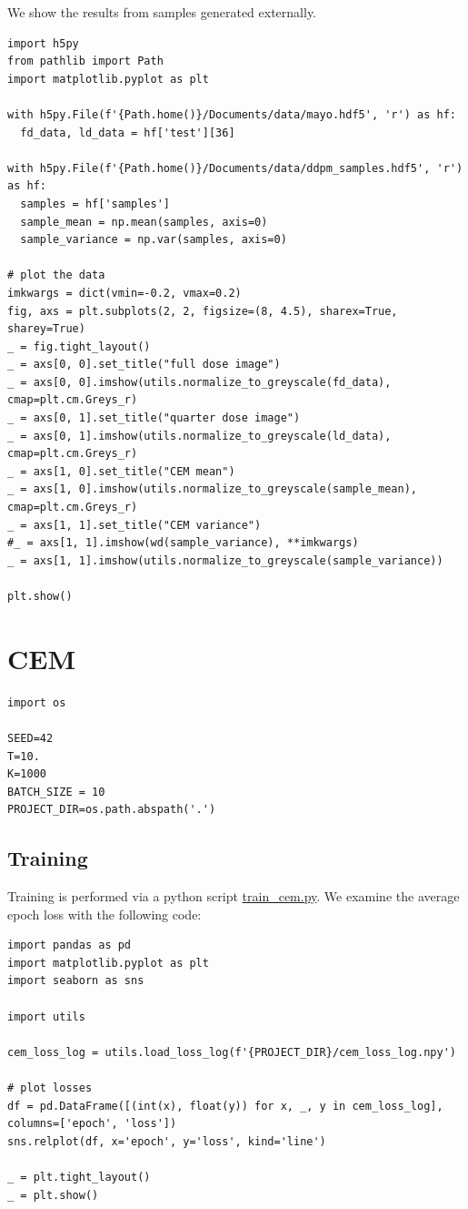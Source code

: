 \documentclass[a4paper, 11pt]{article}
\begin{document}
We show the results from samples generated externally.
\begin{verbatim}
import h5py
from pathlib import Path
import matplotlib.pyplot as plt

with h5py.File(f'{Path.home()}/Documents/data/mayo.hdf5', 'r') as hf:
  fd_data, ld_data = hf['test'][36]

with h5py.File(f'{Path.home()}/Documents/data/ddpm_samples.hdf5', 'r') as hf:
  samples = hf['samples']
  sample_mean = np.mean(samples, axis=0)
  sample_variance = np.var(samples, axis=0)

# plot the data
imkwargs = dict(vmin=-0.2, vmax=0.2)
fig, axs = plt.subplots(2, 2, figsize=(8, 4.5), sharex=True, sharey=True)
_ = fig.tight_layout()
_ = axs[0, 0].set_title("full dose image")
_ = axs[0, 0].imshow(utils.normalize_to_greyscale(fd_data), cmap=plt.cm.Greys_r)
_ = axs[0, 1].set_title("quarter dose image")
_ = axs[0, 1].imshow(utils.normalize_to_greyscale(ld_data), cmap=plt.cm.Greys_r)
_ = axs[1, 0].set_title("CEM mean")
_ = axs[1, 0].imshow(utils.normalize_to_greyscale(sample_mean), cmap=plt.cm.Greys_r)
_ = axs[1, 1].set_title("CEM variance")
#_ = axs[1, 1].imshow(wd(sample_variance), **imkwargs)
_ = axs[1, 1].imshow(utils.normalize_to_greyscale(sample_variance))

plt.show()
\end{verbatim}

\section{CEM}
\label{sec:orgedab874}
\begin{verbatim}
import os

SEED=42
T=10.
K=1000
BATCH_SIZE = 10
PROJECT_DIR=os.path.abspath('.')
\end{verbatim}
\subsection{Training}
\label{sec:org750e617}
Training is performed via a python script \url{train\_cem.py}. We examine the average epoch loss with the following code:
\begin{verbatim}
import pandas as pd
import matplotlib.pyplot as plt
import seaborn as sns

import utils

cem_loss_log = utils.load_loss_log(f'{PROJECT_DIR}/cem_loss_log.npy')

# plot losses
df = pd.DataFrame([(int(x), float(y)) for x, _, y in cem_loss_log], columns=['epoch', 'loss'])
sns.relplot(df, x='epoch', y='loss', kind='line')

_ = plt.tight_layout()
_ = plt.show()
\end{verbatim}
\end{document}
